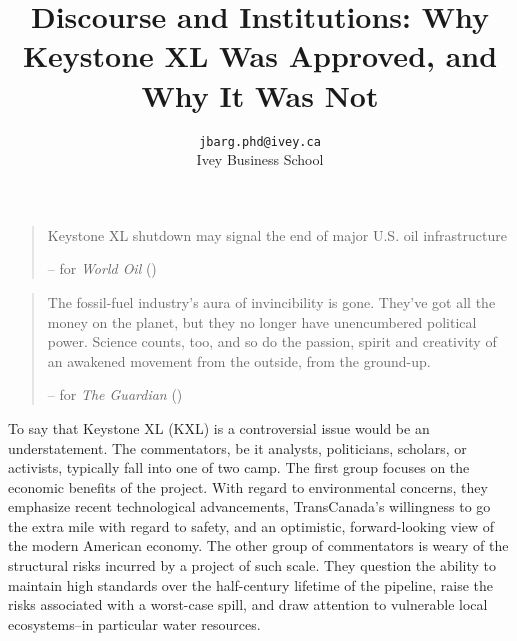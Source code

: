 \documentclass{article}
\title{Discourse and Institutions: Why Keystone XL Was Approved, and Why It Was Not}
\author{
	\texttt{jbarg.phd@ivey.ca}\\
	Ivey Business School
}
\begin{document}
	\maketitle
	\clearpage



	\begin{quote}
		Keystone XL shutdown may signal the end of major U.S. oil infrastructure

		-- \citeauthor{Freitas2021} for \textit{World Oil} (\citeyear{Freitas2021})
	\end{quote}

	\begin{quote}
		The fossil-fuel industry’s aura of invincibility is gone. They’ve got all the money on the planet, but they no longer have unencumbered political power. Science counts, too, and so do the passion, spirit and creativity of an awakened movement from the outside, from the ground-up.

		-- \citeauthor{McKibben2015} for \textit{The Guardian} (\citeyear{McKibben2015})
	\end{quote}

	To say that Keystone XL (KXL) is a controversial issue would be an understatement. The commentators, be it analysts, politicians, scholars, or activists, typically fall into one of two camp. The first group focuses on the economic benefits of the project. With regard to environmental concerns, they emphasize recent technological advancements, TransCanada's willingness to go the extra mile with regard to safety, and an optimistic, forward-looking view of the modern American economy. The other group of commentators is weary of the structural risks incurred by a project of such scale. They question the ability to maintain high standards over the half-century lifetime of the pipeline, raise the risks associated with a worst-case spill, and draw attention to vulnerable local ecosystems--in particular water resources.
\end{document}
